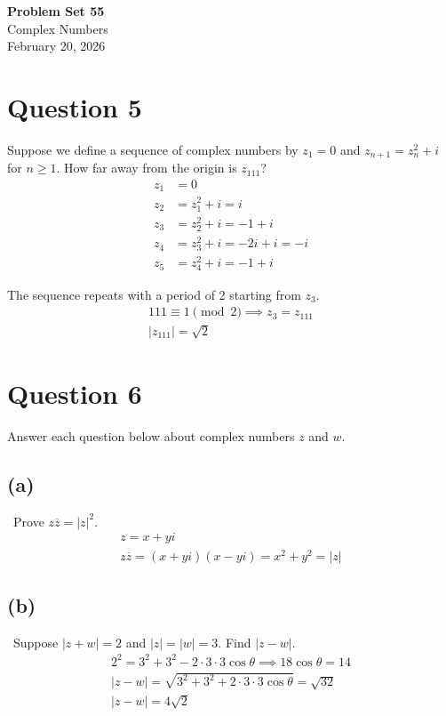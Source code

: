 \documentclass[12pt]{article}
\begin{document}
\vspace*{0cm}

\begin{center}
    {\Large \bfseries Problem Set 55} \\[0.5cm]
    {\large Complex Numbers} \\[0.35cm]
    {\normalsize February 20, 2026}
\end{center}


\section{Question 5}
Suppose we define a sequence of complex numbers by $z_1=0$ and $z_{n+1} = z_n^2 + i$ for $n \ge 1$. How far away from the origin is $z_{111}$?
\begin{align*}
    z_1&=0\\
    z_2&=z_1^2+i=i\\
    z_3&=z_2^2+i=-1+i\\
    z_4&=z_3^2+i=-2i+i=-i\\
    z_5&=z_4^2+i=-1+i
\end{align*}

The sequence repeats with a period of 2 starting from $z_3$.
\begin{gather*}
    111 \equiv 1 \pmod 2 \implies z_3=z_{111}\\
    \boxed{|z_{111}|=\sqrt{2}}
\end{gather*}

\section{Question 6}
Answer each question below about complex numbers $z$ and $w$.

\subsection{(a)} \, Prove $z\overline{z}=|z|^2.$
\begin{gather*}
    z=x+yi\\
    z\overline{z}=(x+yi)(x-yi)=x^2+y^2=|z|
\end{gather*}

\subsection{(b)} \, Suppose $|z + w| = 2$ and $|z| = |w| = 3$. Find $|z - w|$.
\begin{gather*}
    2^2=3^2+3^2-2\cdot3\cdot3 \cos\theta \implies 18 \cos \theta = 14\\
    |z-w|=\sqrt{3^2+3^2+2\cdot3\cdot3\cos\theta}=\sqrt{32}\\
    \boxed{|z-w|=4\sqrt{2}}
\end{gather*}
\end{document}
